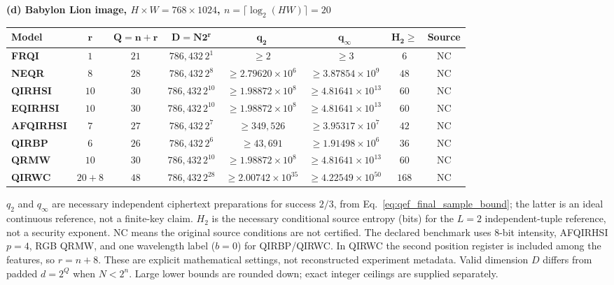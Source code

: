 \begin{table}
\par\vspace{0.3cm}
\textbf{(d) Babylon Lion image, $H\times W=768\times1024$, $n=\lceil\log_2(HW)\rceil=20$}\\[3pt]
{\footnotesize\setlength{\tabcolsep}{4pt}
\begin{tabular}{lccccccc}
\hline\rowcolor{Bisque3}
\textbf{Model} & $\boldsymbol{r}$ & $\boldsymbol{Q=n+r}$ & $\boldsymbol{D=N2^r}$ & $\boldsymbol{q_2}$ & $\boldsymbol{q_\infty}$ & $\boldsymbol{H_2\geq}$ & \textbf{Source}\\
\hline
\textbf{FRQI} & \(1\) & \(21\) & \(786{,}432\,2^{1}\) & $\geq 2$ & $\geq 3$ & \(6\) & NC \\
\textbf{NEQR} & \(8\) & \(28\) & \(786{,}432\,2^{8}\) & $\geq 2.79620\times10^{6}$ & $\geq 3.87854\times10^{9}$ & \(48\) & NC \\
\textbf{QIRHSI} & \(10\) & \(30\) & \(786{,}432\,2^{10}\) & $\geq 1.98872\times10^{8}$ & $\geq 4.81641\times10^{13}$ & \(60\) & NC \\
\textbf{EQIRHSI} & \(10\) & \(30\) & \(786{,}432\,2^{10}\) & $\geq 1.98872\times10^{8}$ & $\geq 4.81641\times10^{13}$ & \(60\) & NC \\
\textbf{AFQIRHSI} & \(7\) & \(27\) & \(786{,}432\,2^{7}\) & $\geq 349{,}526$ & $\geq 3.95317\times10^{7}$ & \(42\) & NC \\
\textbf{QIRBP} & \(6\) & \(26\) & \(786{,}432\,2^{6}\) & $\geq 43{,}691$ & $\geq 1.91498\times10^{6}$ & \(36\) & NC \\
\textbf{QRMW} & \(10\) & \(30\) & \(786{,}432\,2^{10}\) & $\geq 1.98872\times10^{8}$ & $\geq 4.81641\times10^{13}$ & \(60\) & NC \\
\textbf{QIRWC} & \(20+8\) & \(48\) & \(786{,}432\,2^{28}\) & $\geq 2.00742\times10^{35}$ & $\geq 4.22549\times10^{50}$ & \(168\) & NC \\
\hline\end{tabular}}\par
\vspace{0.2cm}
\parbox{\textwidth}{\footnotesize\color{red}
$q_2$ and $q_\infty$ are necessary independent ciphertext preparations for success $2/3$, from Eq.~\eqref{eq:qef_final_sample_bound}; the latter is an ideal continuous reference, not a finite-key claim.
$H_2$ is the necessary conditional source entropy (bits) for the $L=2$ independent-tuple reference, not a security exponent. NC means the original source conditions are not certified.
The declared benchmark uses 8-bit intensity, AFQIRHSI $p=4$, RGB QRMW, and one wavelength label ($b=0$) for QIRBP/QIRWC. In QIRWC the second position register is included among the features, so $r=n+8$.
These are explicit mathematical settings, not reconstructed experiment metadata.
Valid dimension $D$ differs from padded $d=2^Q$ when $N<2^n$.
Large lower bounds are rounded down; exact integer ceilings are supplied separately.}
\end{table}
